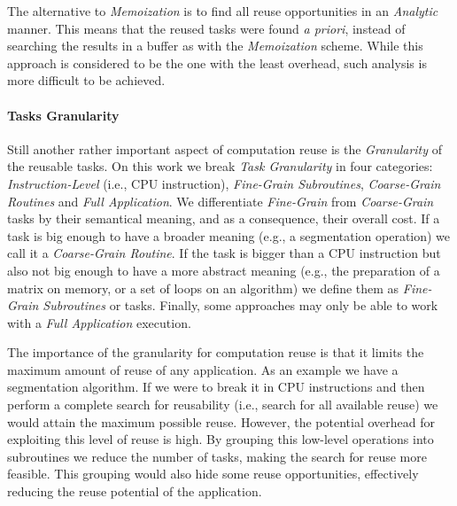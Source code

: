 

The alternative to {\it Memoization} is to find all reuse opportunities in an {\it Analytic} manner. This means that the reused tasks were found {\it a priori}, instead of searching the results in a buffer as with the {\it Memoization} scheme. While this approach is considered to be the one with the least overhead, such analysis is more difficult to be achieved.


\paragraph{Tasks Granularity}

Still another rather important aspect of computation reuse is the {\it Granularity} of the reusable tasks. On this work we break {\it Task Granularity} in four categories: {\it Instruction-Level} (i.e., CPU instruction), {\it Fine-Grain Subroutines}, {\it Coarse-Grain Routines} and {\it Full Application}. We differentiate {\it Fine-Grain} from {\it Coarse-Grain} tasks by their semantical meaning, and as a consequence, their overall cost. If a task is big enough to have a broader meaning (e.g., a segmentation operation) we call it a {\it Coarse-Grain Routine}. If the task is bigger than a CPU instruction but also not big enough to have a more abstract meaning (e.g., the preparation of a matrix on memory, or a set of loops on an algorithm) we define them as {\it Fine-Grain Subroutines} or tasks. Finally, some approaches may only be able to work with a {\it Full Application} execution.

The importance of the granularity for computation reuse is that it limits the maximum amount of reuse of any application. As an example we have a segmentation algorithm. If we were to break it in CPU instructions and then perform a complete search for reusability (i.e., search for all available reuse) we would attain the maximum possible reuse. However, the potential overhead for exploiting this level of reuse is high. By grouping this low-level operations into subroutines we reduce the number of tasks, making the search for reuse more feasible. This grouping would also hide some reuse opportunities, effectively reducing the reuse potential of the application. 


